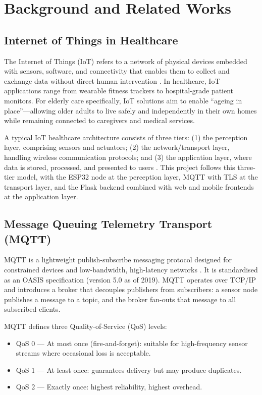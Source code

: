 \chapter{Background and Related Works}

\section{Internet of Things in Healthcare}

The Internet of Things (IoT) refers to a network of physical devices embedded with sensors, software, and connectivity that enables them to collect and exchange data without direct human intervention \cite{Atzori2010}. In healthcare, IoT applications range from wearable fitness trackers to hospital-grade patient monitors. For elderly care specifically, IoT solutions aim to enable ``ageing in place''---allowing older adults to live safely and independently in their own homes while remaining connected to caregivers and medical services.

A typical IoT healthcare architecture consists of three tiers: (1) the perception layer, comprising sensors and actuators; (2) the network/transport layer, handling wireless communication protocols; and (3) the application layer, where data is stored, processed, and presented to users \cite{Islam2015}. This project follows this three-tier model, with the ESP32 node at the perception layer, MQTT with TLS at the transport layer, and the Flask backend combined with web and mobile frontends at the application layer.

\section{Message Queuing Telemetry Transport (MQTT)}

MQTT is a lightweight publish-subscribe messaging protocol designed for constrained devices and low-bandwidth, high-latency networks \cite{Banks2019}. It is standardised as an OASIS specification (version 5.0 as of 2019). MQTT operates over TCP/IP and introduces a broker that decouples publishers from subscribers: a sensor node publishes a message to a topic, and the broker fan-outs that message to all subscribed clients.

MQTT defines three Quality-of-Service (QoS) levels:
\begin{itemize}
    \item QoS 0 --- At most once (fire-and-forget): suitable for high-frequency sensor streams where occasional loss is acceptable.
    \item QoS 1 --- At least once: guarantees delivery but may produce duplicates.
    \item QoS 2 --- Exactly once: highest reliability, highest overhead.
\end{itemize}

